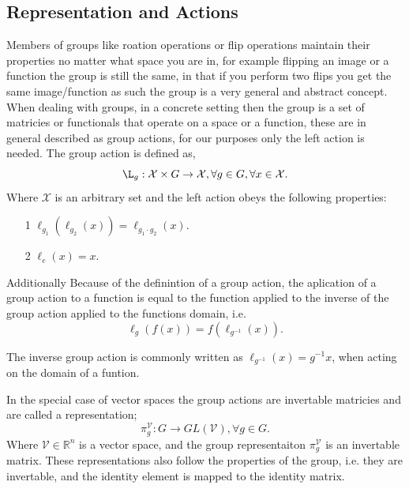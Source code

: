 \subsection{Representation and Actions}
Members of groups like roation operations or flip operations maintain their properties no matter what space you are in, for example flipping an image or a function the group is still the same, in that if you perform two flips you get the same image/function as such the group is a very general and abstract concept. When dealing with groups, in a concrete setting then the group is a set of matricies or functionals that operate on a space or a function, these are in general described as group actions, for our purposes only the left action is needed. The group action is defined as, 
\begin{equation}
	\L_g: \mathcal{X} \times G \rightarrow \mathcal{X}, \forall g \in G, \forall x \in \mathcal{X}.
\end{equation}
Where $\mathcal{X}$ is an arbitrary set and the left action obeys the following properties:
\begin{itemize}
	\item[1] $\ell_{g_1}(\ell_{g_2}(x)) = \ell_{g_1 \cdot g_2}(x)$.
	\item[2] $\ell_e(x) = x$.
\end{itemize}
Additionally Because of the definintion of a group action, the aplication of a group action to a function is equal to the function applied to the inverse of the group action applied to the functions domain, i.e.
\begin{equation}
	\ell_g(f(x)) = f(\ell_{g^{-1}}(x)).
\end{equation}

The inverse group action is commonly written as $\ell_{g^{-1}}(x) = g^{-1}x$, when acting on the domain of a funtion.

In the special case of vector spaces the group actions are invertable matricies and are called a representation; 
\begin{equation}
	\pi_g^\mathcal{V}: G \rightarrow GL(\mathcal{V}), \forall g \in G.
\end{equation}
Where $\mathcal{V} \in \mathbb{R}^n$ is a vector space, and the group representaiton $\pi_g^\mathcal{V}$ is an invertable matrix. These representations also follow the properties of the group, i.e. they are invertable, and the identity element is mapped to the identity matrix. 
